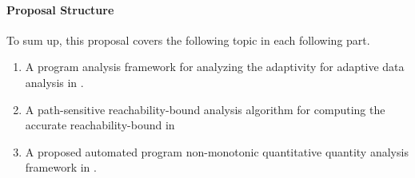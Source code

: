 \paragraph*{Proposal Structure}
To sum up, this proposal covers the following topic in each following part.
\begin{enumerate}
 \item A program analysis framework for analyzing the adaptivity for adaptive data analysis in .
 \item A path-sensitive reachability-bound analysis algorithm for computing the accurate reachability-bound in 
\item A proposed automated program non-monotonic quantitative quantity analysis framework in .
\end{enumerate}